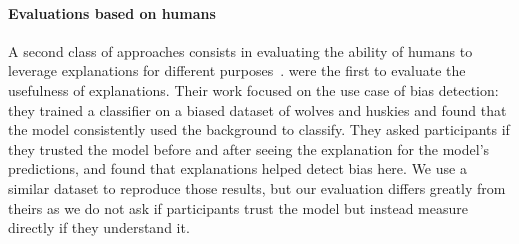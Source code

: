 \paragraph{Evaluations based on humans}
A second class of approaches consists in evaluating the ability of humans to leverage explanations for different purposes~\cite{ribeiro2016lime, selvaraju2017gradcam, mac2018teaching, chandrasekaran2018explanations, alufaisan2020does, biessmann2021quality, nguyen2021effectiveness, shen2020useful,nguyen2018comparing,hase2020evaluating,nguyen2022visual}.
\cite{ribeiro2016lime} were the first to evaluate the usefulness of explanations. Their work focused on the use case of bias detection: they trained a classifier on a biased dataset of wolves and huskies and found that the model consistently used the background to classify. They asked participants if they trusted the model before and after seeing the explanation for the model's predictions, and found that explanations helped detect bias here. We use a similar dataset to reproduce those results, but our evaluation differs greatly from theirs as we do not ask if participants trust the model but instead measure directly if they understand it. 

